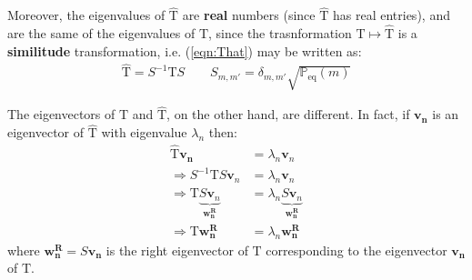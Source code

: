 \documentclass[../../main.tex]{subfiles}
\begin{document}
\begin{enumerate}
    Moreover, the eigenvalues of $\hat{\mathrm{T}}$ are \textbf{real} numbers (since $\hat{\mathrm{T}}$ has real entries), and are the same of the eigenvalues of $\mathrm{T}$, since the trasnformation $\mathrm{T} \mapsto \hat{\mathrm{T}}$ is a \textbf{similitude} transformation, i.e. (\ref{eqn:That}) may be written as:
    \begin{align*}
        \hat{\mathrm{T}} = S^{-1} \mathrm{T} S \qquad S_{m,m'} = \delta_{m,m'} \sqrt{\mathbb{P}_{\mathrm{eq}}(m)}
    \end{align*} 
    
    The eigenvectors of $\mathrm{T}$ and $\hat{\mathrm{T}}$, on the other hand, are different. In fact, if $\bm{v_n}$ is an eigenvector of $\hat{\mathrm{T}}$ with eigenvalue $\lambda_n$ then:
    \begin{align}\nonumber
        \hat{\mathrm{T}} \bm{v_n} &= \lambda_n \bm{v}_n \\ \nonumber
        \Rightarrow  S^{-1} \mathrm{T} S \bm{v}_n &= \lambda_n \bm{v}_n\\ \nonumber
        \Rightarrow  \mathrm{T} \underbrace{S \bm{v}_n}_{\bm{w_n^R}}  &= \lambda_n \underbrace{S \bm{v}_n}_{\bm{w_n^R}} \\
        \Rightarrow  \mathrm{T} \bm{w_n^R} &= \lambda_n \bm{w_n^R}
        \label{eqn:right-eigenvector}
    \end{align}
    where $\bm{w_n^R} = S \bm{v_n}$ is the right eigenvector of $\mathrm{T}$ corresponding to the eigenvector $\bm{v_n}$ of $\hat{\mathrm{T}}$.

    \medskip


\end{enumerate}
\end{document}
